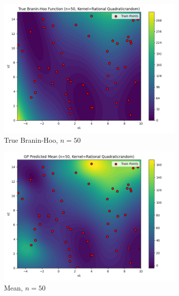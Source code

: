\documentclass[a4paper,12pt]{article}
\begin{document}
\begin{figure}[H]
\begin{subfigure}{0.3\textwidth}
  \includegraphics[width=\linewidth]{Task-02/images/true_function_rational_quadratic_n50_random.png}
  \caption{True Branin-Hoo, $n=50$}
\end{subfigure}
\begin{subfigure}{0.3\textwidth}
    \includegraphics[width=\linewidth]{Task-02/images/gp_mean_rational_quadratic_n50_random.png}
    \caption{Mean, $n=50$}
\end{subfigure}
\begin{subfigure}{0.3\textwidth}

\end{subfigure}
\end{figure}
\end{document}
